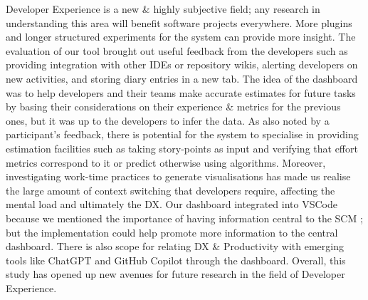 \documentclass[../mpaper.tex]{subfiles}
\begin{document}
Developer Experience is a new \& highly subjective field; any research in understanding this area will benefit software projects everywhere. More plugins and longer structured experiments for the system can provide more insight. The evaluation of our tool brought out useful feedback from the developers such as providing integration with other IDEs or repository wikis, alerting developers on new activities, and storing diary entries in a new tab. The idea of the dashboard was to help developers and their teams make accurate estimates for future tasks by basing their considerations on their experience \& metrics for the previous ones, but it was up to the developers to infer the data. As also noted by a participant's feedback, there is potential for the system to specialise in providing estimation facilities such as taking story-points as input and verifying that effort metrics correspond to it or predict otherwise using algorithms. Moreover, investigating work-time practices to generate visualisations has made us realise the large amount of context switching that developers require, affecting the mental load and ultimately the DX. Our dashboard integrated into VSCode because we mentioned the importance of having information central to the SCM \cite{edwardsSciitEmbeddingIssue2021}; but the implementation could help promote more information to the central dashboard. There is also scope for relating DX \& Productivity with emerging tools like ChatGPT and GitHub Copilot through the dashboard. Overall, this study has opened up new avenues for future research in the field of Developer Experience.
\end{document}
